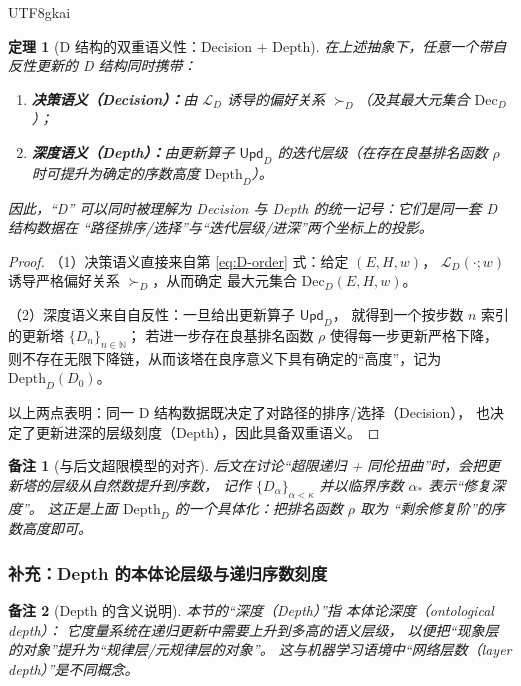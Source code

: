 \documentclass[12pt]{article}
\newtheorem{theorem}{定理}[section]
\newtheorem{remark}{备注}[section]
\begin{document}
\begin{CJK*}{UTF8}{gkai}
\begin{theorem}[D 结构的双重语义性：Decision + Depth]\label{thm:D-dual-semantics}
在上述抽象下，任意一个带自反性更新的 D 结构同时携带：
\begin{enumerate}
  \item \textbf{决策语义（Decision）：}由 $\mathcal{L}_D$ 诱导的偏好关系 $\succ_D$（及其最大元集合 $\mathrm{Dec}_D$）；
  \item \textbf{深度语义（Depth）：}由更新算子 $\mathsf{Upd}_D$ 的迭代层级（在存在良基排名函数 $\rho$ 时可提升为确定的序数高度 $\mathrm{Depth}_D$）。
\end{enumerate}
因此，“D” 可以同时被理解为 \textnormal{Decision} 与 \textnormal{Depth} 的统一记号：它们是同一套 D 结构数据在
“路径排序/选择”与“迭代层级/进深”两个坐标上的投影。
\end{theorem}

\begin{proof}
（1）决策语义直接来自第 \ref{eq:D-order} 式：给定 $(E,H,w)$，
$\mathcal{L}_D(\cdot;w)$ 诱导严格偏好关系 $\succ_D$，从而确定
最大元集合 $\mathrm{Dec}_D(E,H,w)$。

（2）深度语义来自自反性：一旦给出更新算子 $\mathsf{Upd}_D$，
就得到一个按步数 $n$ 索引的更新塔 $\{D_n\}_{n\in\mathbb{N}}$；
若进一步存在良基排名函数 $\rho$ 使得每一步更新严格下降，
则不存在无限下降链，从而该塔在良序意义下具有确定的“高度”，记为
$\mathrm{Depth}_D(D_0)$。

以上两点表明：同一 D 结构数据既决定了对路径的排序/选择（Decision），
也决定了更新进深的层级刻度（Depth），因此具备双重语义。
\end{proof}

\begin{remark}[与后文超限模型的对齐]
后文在讨论“超限递归 + 同伦扭曲”时，会把更新塔的层级从自然数提升到序数，
记作 $\{D_\alpha\}_{\alpha<\kappa}$ 并以临界序数 $\alpha_\ast$ 表示“修复深度”。
这正是上面 $\mathrm{Depth}_D$ 的一个具体化：把排名函数 $\rho$ 取为
“剩余修复阶”的序数高度即可。
\end{remark}

\subsubsection*{补充：Depth 的本体论层级与递归序数刻度}

\begin{remark}[Depth 的含义说明]
本节的“深度（Depth）”指
\emph{本体论深度（ontological depth）}：
它度量系统在递归更新中\emph{需要上升到多高的语义层级}，
以便把“现象层的对象”提升为“规律层/元规律层的对象”。
这与机器学习语境中“网络层数（layer depth）”是不同概念。
\end{remark}


\end{CJK*}
\end{document}
